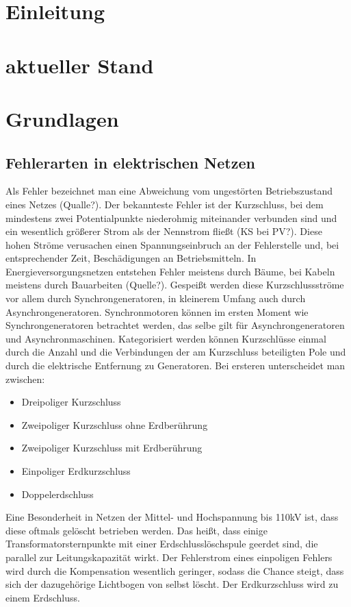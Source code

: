 \documentclass{scrartcl}
\begin{document}
	\newpage
	\setcounter{page}{1}
\begin{onehalfspace}

\section{Einleitung}
\section{aktueller Stand}
\section{Grundlagen}
\subsection{Fehlerarten in elektrischen Netzen}
Als Fehler bezeichnet man eine Abweichung vom ungestörten Betriebszustand eines Netzes (Qualle?). Der bekannteste Fehler ist der Kurzschluss, bei dem mindestens zwei Potentialpunkte niederohmig miteinander verbunden sind und ein wesentlich größerer Strom als der Nennstrom fließt (KS bei PV?). Diese hohen Ströme verusachen einen Spannungseinbruch an der Fehlerstelle und, bei entsprechender Zeit, Beschädigungen an Betriebsmitteln. In Energieversorgungsnetzen entstehen Fehler meistens durch Bäume, bei Kabeln meistens durch Bauarbeiten (Quelle?). Gespeißt werden diese Kurzschlussströme vor allem durch Synchrongeneratoren, in kleinerem Umfang auch durch Asynchrongeneratoren. Synchronmotoren können im ersten Moment wie Synchrongeneratoren betrachtet werden, das selbe gilt für Asynchrongeneratoren und Asynchronmaschinen. Kategorisiert werden können Kurzschlüsse einmal durch die Anzahl und die Verbindungen der am Kurzschluss beteiligten Pole und durch die elektrische Entfernung zu Generatoren. Bei ersteren unterscheidet man zwischen:

\begin{itemize}
\item Dreipoliger Kurzschluss
\item Zweipoliger Kurzschluss ohne Erdberührung
\item Zweipoliger Kurzschluss mit Erdberührung
\item Einpoliger Erdkurzschluss
\item Doppelerdschluss
\end{itemize}

Eine Besonderheit in Netzen der Mittel- und Hochspannung bis 110kV ist, dass diese oftmals gelöscht betrieben werden. Das heißt, dass einige Transformatorsternpunkte mit einer Erdschlusslöschspule geerdet sind, die parallel zur Leitungskapazität wirkt. Der Fehlerstrom eines einpoligen Fehlers wird durch die Kompensation wesentlich geringer, sodass die Chance steigt, dass sich der dazugehörige Lichtbogen von selbst löscht. Der Erdkurzschluss wird zu einem Erdschluss.


\end{onehalfspace}
\end{document}
